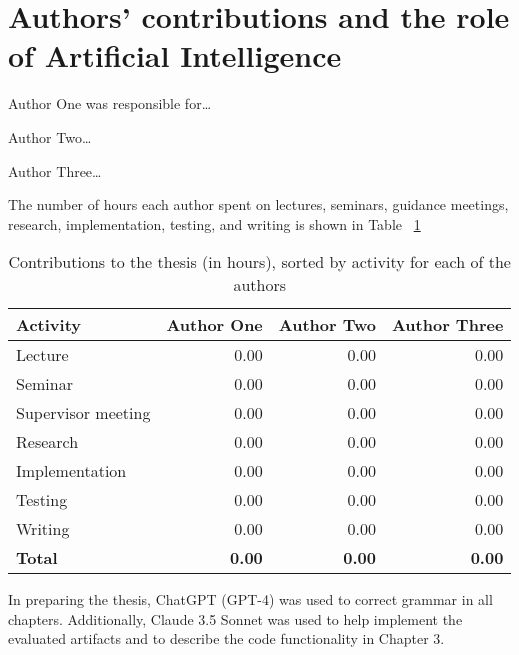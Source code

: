 \section{Authors' contributions and the role of Artificial Intelligence}
\label{sec:introduction}

Author One was responsible for\ldots

Author Two\ldots

Author Three\ldots

The number of hours each author spent on lectures, seminars, guidance
meetings, research, implementation, testing, and writing is shown in
Table ~\ref{tab:combined_hours}

\begin{table}[h]
\caption{Contributions to the thesis (in hours), sorted by activity for each of the authors}
\centering
\renewcommand{\arraystretch}{1.2}
\begin{tabular}{|l|r|r|r|}
\hline
\textbf{Activity} & \textbf{Author One} & \textbf{Author Two} & \textbf{Author Three} \\
\hline
Lecture & 0.00 & 0.00 & 0.00 \\
Seminar & 0.00 & 0.00 & 0.00 \\
Supervisor meeting & 0.00 & 0.00 & 0.00 \\
Research & 0.00 & 0.00 & 0.00 \\
Implementation & 0.00 & 0.00 & 0.00 \\
Testing & 0.00 & 0.00 & 0.00 \\
Writing & 0.00 & 0.00 & 0.00 \\
\hline
\textbf{Total} & \textbf{0.00} & \textbf{0.00} & \textbf{0.00} \\
\hline
\end{tabular}
\label{tab:combined_hours}
\end{table}

In preparing the thesis, ChatGPT (GPT-4) was used to correct grammar
in all chapters. Additionally, Claude 3.5 Sonnet was used to help
implement the evaluated artifacts and to describe the code
functionality in Chapter 3.

